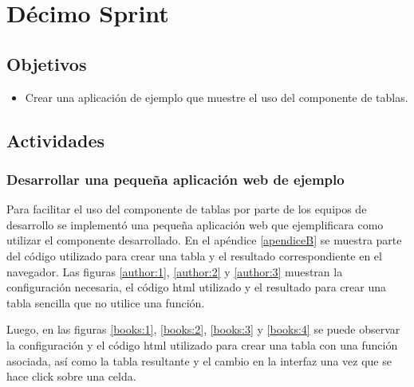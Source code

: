 \section{Décimo Sprint}

\subsection{Objetivos}
\begin{itemize}
  \item Crear una aplicación de ejemplo que muestre el uso del componente de tablas.
\end{itemize}
\subsection{Actividades}
\subsubsection{Desarrollar una pequeña aplicación web de ejemplo}
Para facilitar el uso del componente de tablas por parte de los equipos de
desarrollo se implementó una pequeña aplicación web que ejemplificara
como utilizar el componente desarrollado. En el apéndice \ref{apendiceB} se muestra parte
del código utilizado para crear una tabla y el resultado correspondiente en el navegador.
Las figuras \ref{author:1}, \ref{author:2} y \ref{author:3} muestran la configuración necesaria,
el código html utilizado y el resultado para crear una tabla sencilla que no utilice una función.

Luego, en las figuras \ref{books:1}, \ref{books:2}, \ref{books:3} y \ref{books:4} se puede observar
la configuración y el código html utilizado para crear una tabla con una función asociada, así como
la tabla resultante y el cambio en la interfaz una vez que se hace click sobre una celda.